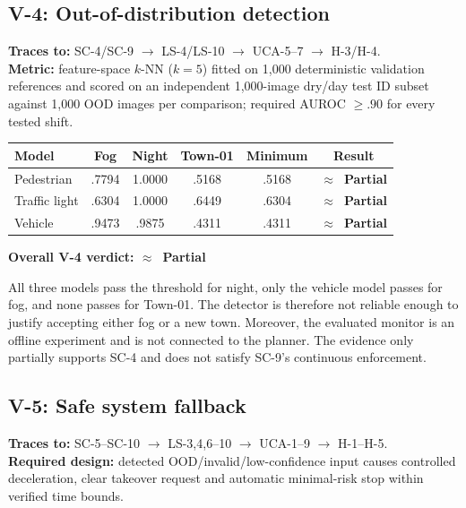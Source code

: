 \documentclass[nologo,a4paper,12pt]{article}
\makeatletter
\newcommand{\verdictpartial}{\textbf{\color{mls@yellow}$\approx$~Partial}}
\makeatother
\begin{document}
\subsection{V-4: Out-of-distribution detection}

\begin{mdframed}[style=subclaim]
\textbf{Traces to:} SC-4/SC-9 $\rightarrow$ LS-4/LS-10 $\rightarrow$ UCA-5--7
$\rightarrow$ H-3/H-4.\\
\textbf{Metric:} feature-space $k$-NN ($k=5$) fitted on 1,000 deterministic validation
references and scored on an independent 1,000-image dry/day test ID subset against 1,000 OOD
images per comparison; required AUROC $\geq.90$ for every tested shift.
\end{mdframed}

\begin{mdframed}[style=evidencestyle]
\centering
\begin{tabular}{lccccc}
\toprule
Model & Fog & Night & Town-01 & Minimum & Result \\
\midrule
Pedestrian & .7794 & 1.0000 & .5168 & .5168 & \verdictpartial \\
Traffic light & .6304 & 1.0000 & .6449 & .6304 & \verdictpartial \\
Vehicle & .9473 & .9875 & .4311 & .4311 & \verdictpartial \\
\bottomrule
\end{tabular}

\medskip
\textbf{Overall V-4 verdict: \verdictpartial}
\end{mdframed}

All three models pass the threshold for night, only the vehicle model passes for fog, and none
passes for Town-01. The detector is therefore not reliable enough to justify accepting either
fog or a new town. Moreover, the evaluated monitor is an offline experiment and is not connected
to the planner. The evidence only partially supports SC-4 and does not satisfy SC-9's continuous
enforcement.

\subsection{V-5: Safe system fallback}

\begin{mdframed}[style=subclaim]
\textbf{Traces to:} SC-5--SC-10 $\rightarrow$ LS-3,4,6--10 $\rightarrow$
UCA-1--9 $\rightarrow$ H-1--H-5.\\
\textbf{Required design:} detected OOD/invalid/low-confidence input causes controlled deceleration,
clear takeover request and automatic minimal-risk stop within verified time bounds.
\end{mdframed}
\end{document}
